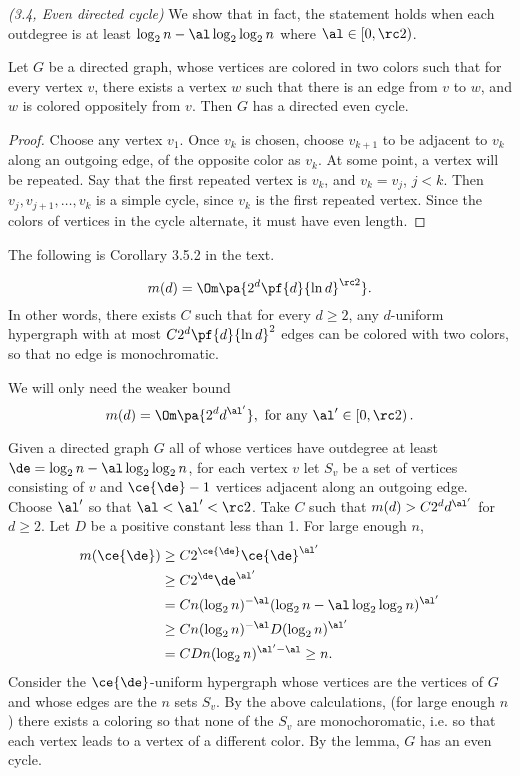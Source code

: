 \begin{problem} {\it (3.4, Even directed cycle)}
We show that in fact, the statement holds when each outdegree is at least $\log_2n-\al \log_2\log_2 n$ where $\al\in[0,\rc 2)$.
\begin{lem}
Let $G$ be a directed graph, whose vertices are colored in two colors such that for every vertex $v$, there exists a vertex $w$ such that there is an edge from $v$ to $w$, and $w$ is colored oppositely from $v$. Then $G$ has a directed even cycle.
\end{lem}
\begin{proof}
Choose any vertex $v_1$. Once $v_k$ is chosen, choose $v_{k+1}$ to be adjacent to $v_k$ along an outgoing edge, of the opposite color as $v_k$. At some point, a vertex will be repeated. Say that the first repeated vertex is $v_k$, and $v_k=v_j$, $j<k$. Then $v_j,v_{j+1},\ldots, v_k$ is a simple cycle, since $v_k$ is the first repeated vertex. Since the colors of vertices in the cycle alternate, it must have even length.
\end{proof}
The following is Corollary 3.5.2 in the text.
\begin{thm}
\[m(d)=\Om\pa{2^d\pf{d}{\ln d}^{\rc2}}.\]
In other words, there exists $C$ such that for every $d\ge 2$, any $d$-uniform hypergraph with at most $C2^d\pf{d}{\ln d}^2$ edges can be colored with two colors, so that no edge is monochromatic.
\end{thm}
We will only need the weaker bound
\[
m(d)=\Om\pa{2^dd^{\al'}},\text{ for any }\al'\in\left[0,\rc 2\right).
\]

Given a directed graph $G$ all of whose vertices have outdegree at least $\de=\log_2n-\al\log_2\log_2n$, for each vertex $v$ let $S_v$ be a set of vertices consisting of $v$ and $\ce{\de}-1$ vertices adjacent along an outgoing edge. Choose $\al'$ so that $\al<\al'<\rc 2$.
Take $C$ such that $m(d)>C2^dd^{\al'}$ for $d\ge 2$. Let $D$ be a positive constant less than 1. For large enough $n$, 
\begin{align*}
m(\ce{\de})&\ge C2^{\ce{\de}}\ce{\de}^{\al'}\\
&\ge C2^{\de} \de^{\al'}\\
&=Cn(\log_2 n)^{-\al} (\log_2 n-\al\log_2\log_2n)^{\al'}\\
&\ge Cn(\log_2 n)^{-\al} D(\log_2n)^{\al'}\\
&=CDn(\log_2 n)^{\al'-\al}\ge n.
\end{align*}
Consider the $\ce{\de}$-uniform hypergraph whose vertices are the vertices of $G$ and whose edges are the $n$ sets $S_v$. 
By the above calculations, (for large enough $n$) there exists a coloring so that none of the $S_v$ are monochoromatic, i.e. so that each vertex leads to a vertex of a different color. By the lemma, $G$ has an even cycle.
\end{problem}

